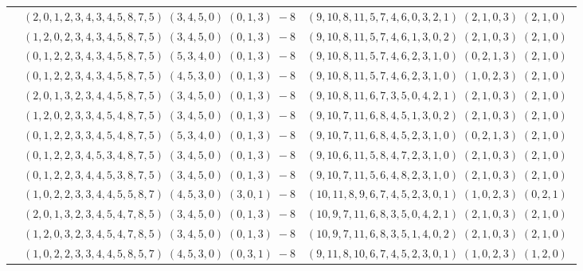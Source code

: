 \documentclass[11pt]{article}
\begin{document}
\begin{longtable}[l]{|c|c|c|}
 \cline{2-3} 
 & $(2 ,0 ,1 ,2 ,3 ,4 ,3 ,4 ,5 ,8 ,7 ,5) \;(3 ,4 ,5 ,0) \;(0 ,1 ,3) \;-8$ & $(9 ,10 ,8 ,11 ,5 ,7 ,4 ,6 ,0 ,3 ,2 ,1) \;(2 ,1 ,0 ,3) \;(2 ,1 ,0) \;$\\ 
 \cline{2-3} 
 & $(1 ,2 ,0 ,2 ,3 ,4 ,3 ,4 ,5 ,8 ,7 ,5) \;(3 ,4 ,5 ,0) \;(0 ,1 ,3) \;-8$ & $(9 ,10 ,8 ,11 ,5 ,7 ,4 ,6 ,1 ,3 ,0 ,2) \;(2 ,1 ,0 ,3) \;(2 ,1 ,0) \;$\\ 
 \cline{2-3} 
 & $(0 ,1 ,2 ,2 ,3 ,4 ,3 ,4 ,5 ,8 ,7 ,5) \;(5 ,3 ,4 ,0) \;(0 ,1 ,3) \;-8$ & $(9 ,10 ,8 ,11 ,5 ,7 ,4 ,6 ,2 ,3 ,1 ,0) \;(0 ,2 ,1 ,3) \;(2 ,1 ,0) \;$\\ 
 \cline{2-3} 
 & $(0 ,1 ,2 ,2 ,3 ,4 ,3 ,4 ,5 ,8 ,7 ,5) \;(4 ,5 ,3 ,0) \;(0 ,1 ,3) \;-8$ & $(9 ,10 ,8 ,11 ,5 ,7 ,4 ,6 ,2 ,3 ,1 ,0) \;(1 ,0 ,2 ,3) \;(2 ,1 ,0) \;$\\ 
 \cline{2-3} 
 & $(2 ,0 ,1 ,3 ,2 ,3 ,4 ,4 ,5 ,8 ,7 ,5) \;(3 ,4 ,5 ,0) \;(0 ,1 ,3) \;-8$ & $(9 ,10 ,8 ,11 ,6 ,7 ,3 ,5 ,0 ,4 ,2 ,1) \;(2 ,1 ,0 ,3) \;(2 ,1 ,0) \;$\\ 
 \cline{2-3} 
 & $(1 ,2 ,0 ,2 ,3 ,3 ,4 ,5 ,4 ,8 ,7 ,5) \;(3 ,4 ,5 ,0) \;(0 ,1 ,3) \;-8$ & $(9 ,10 ,7 ,11 ,6 ,8 ,4 ,5 ,1 ,3 ,0 ,2) \;(2 ,1 ,0 ,3) \;(2 ,1 ,0) \;$\\ 
 \cline{2-3} 
 & $(0 ,1 ,2 ,2 ,3 ,3 ,4 ,5 ,4 ,8 ,7 ,5) \;(5 ,3 ,4 ,0) \;(0 ,1 ,3) \;-8$ & $(9 ,10 ,7 ,11 ,6 ,8 ,4 ,5 ,2 ,3 ,1 ,0) \;(0 ,2 ,1 ,3) \;(2 ,1 ,0) \;$\\ 
 \cline{2-3} 
 & $(0 ,1 ,2 ,2 ,3 ,4 ,5 ,3 ,4 ,8 ,7 ,5) \;(3 ,4 ,5 ,0) \;(0 ,1 ,3) \;-8$ & $(9 ,10 ,6 ,11 ,5 ,8 ,4 ,7 ,2 ,3 ,1 ,0) \;(2 ,1 ,0 ,3) \;(2 ,1 ,0) \;$\\ 
 \cline{2-3} 
 & $(0 ,1 ,2 ,2 ,3 ,4 ,4 ,5 ,3 ,8 ,7 ,5) \;(3 ,4 ,5 ,0) \;(0 ,1 ,3) \;-8$ & $(9 ,10 ,7 ,11 ,5 ,6 ,4 ,8 ,2 ,3 ,1 ,0) \;(2 ,1 ,0 ,3) \;(2 ,1 ,0) \;$\\ 
 \cline{2-3} 
 & $(1 ,0 ,2 ,2 ,3 ,3 ,4 ,4 ,5 ,5 ,8 ,7) \;(4 ,5 ,3 ,0) \;(3 ,0 ,1) \;-8$ & $(10 ,11 ,8 ,9 ,6 ,7 ,4 ,5 ,2 ,3 ,0 ,1) \;(1 ,0 ,2 ,3) \;(0 ,2 ,1) \;$\\ 
 \cline{2-3} 
 & $(2 ,0 ,1 ,3 ,2 ,3 ,4 ,5 ,4 ,7 ,8 ,5) \;(3 ,4 ,5 ,0) \;(0 ,1 ,3) \;-8$ & $(10 ,9 ,7 ,11 ,6 ,8 ,3 ,5 ,0 ,4 ,2 ,1) \;(2 ,1 ,0 ,3) \;(2 ,1 ,0) \;$\\ 
 \cline{2-3} 
 & $(1 ,2 ,0 ,3 ,2 ,3 ,4 ,5 ,4 ,7 ,8 ,5) \;(3 ,4 ,5 ,0) \;(0 ,1 ,3) \;-8$ & $(10 ,9 ,7 ,11 ,6 ,8 ,3 ,5 ,1 ,4 ,0 ,2) \;(2 ,1 ,0 ,3) \;(2 ,1 ,0) \;$\\ 
 \cline{2-3} 
 & $(1 ,0 ,2 ,2 ,3 ,3 ,4 ,4 ,5 ,8 ,5 ,7) \;(4 ,5 ,3 ,0) \;(0 ,3 ,1) \;-8$ & $(9 ,11 ,8 ,10 ,6 ,7 ,4 ,5 ,2 ,3 ,0 ,1) \;(1 ,0 ,2 ,3) \;(1 ,2 ,0) \;$\\ 

\end{longtable}
\end{document}
